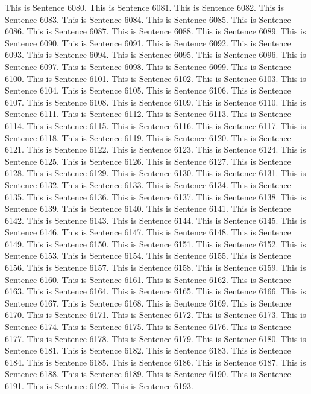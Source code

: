 \documentclass{article}
\begin{document}
This is Sentence 6080.
This is Sentence 6081.
This is Sentence 6082.
This is Sentence 6083.
This is Sentence 6084.
This is Sentence 6085.
This is Sentence 6086.
This is Sentence 6087.
This is Sentence 6088.
This is Sentence 6089.
This is Sentence 6090.
This is Sentence 6091.
This is Sentence 6092.
This is Sentence 6093.
This is Sentence 6094.
This is Sentence 6095.
This is Sentence 6096.
This is Sentence 6097.
This is Sentence 6098.
This is Sentence 6099.
This is Sentence 6100.
This is Sentence 6101.
This is Sentence 6102.
This is Sentence 6103.
This is Sentence 6104.
This is Sentence 6105.
This is Sentence 6106.
This is Sentence 6107.
This is Sentence 6108.
This is Sentence 6109.
This is Sentence 6110.
This is Sentence 6111.
This is Sentence 6112.
This is Sentence 6113.
This is Sentence 6114.
This is Sentence 6115.
This is Sentence 6116.
This is Sentence 6117.
This is Sentence 6118.
This is Sentence 6119.
This is Sentence 6120.
This is Sentence 6121.
This is Sentence 6122.
This is Sentence 6123.
This is Sentence 6124.
This is Sentence 6125.
This is Sentence 6126.
This is Sentence 6127.
This is Sentence 6128.
This is Sentence 6129.
This is Sentence 6130.
This is Sentence 6131.
This is Sentence 6132.
This is Sentence 6133.
This is Sentence 6134.
This is Sentence 6135.
This is Sentence 6136.
This is Sentence 6137.
This is Sentence 6138.
This is Sentence 6139.
This is Sentence 6140.
This is Sentence 6141.
This is Sentence 6142.
This is Sentence 6143.
This is Sentence 6144.
This is Sentence 6145.
This is Sentence 6146.
This is Sentence 6147.
This is Sentence 6148.
This is Sentence 6149.
This is Sentence 6150.
This is Sentence 6151.
This is Sentence 6152.
This is Sentence 6153.
This is Sentence 6154.
This is Sentence 6155.
This is Sentence 6156.
This is Sentence 6157.
This is Sentence 6158.
This is Sentence 6159.
This is Sentence 6160.
This is Sentence 6161.
This is Sentence 6162.
This is Sentence 6163.
This is Sentence 6164.
This is Sentence 6165.
This is Sentence 6166.
This is Sentence 6167.
This is Sentence 6168.
This is Sentence 6169.
This is Sentence 6170.
This is Sentence 6171.
This is Sentence 6172.
This is Sentence 6173.
This is Sentence 6174.
This is Sentence 6175.
This is Sentence 6176.
This is Sentence 6177.
This is Sentence 6178.
This is Sentence 6179.
This is Sentence 6180.
This is Sentence 6181.
This is Sentence 6182.
This is Sentence 6183.
This is Sentence 6184.
This is Sentence 6185.
This is Sentence 6186.
This is Sentence 6187.
This is Sentence 6188.
This is Sentence 6189.
This is Sentence 6190.
This is Sentence 6191.
This is Sentence 6192.
This is Sentence 6193.
\end{document}
